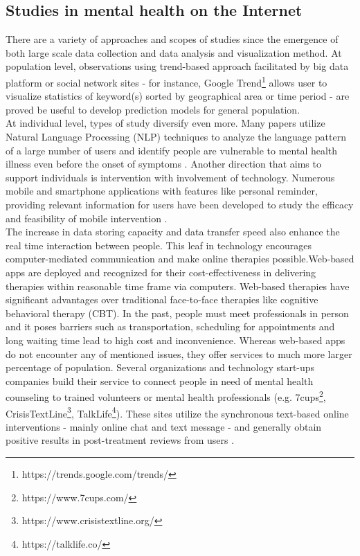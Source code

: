 \subsection*{Studies in mental health on the Internet}
There are a variety of approaches and scopes of studies since the emergence of both large scale data collection and data analysis and visualization method. At population level, observations using trend-based approach facilitated by big data platform or social network sites - for instance, Google Trend\footnote{https://trends.google.com/trends/ } allows user to visualize statistics of keyword(s) sorted by geographical area or time period - are proved be useful to develop prediction models for general population. \\
At individual level, types of study diversify even more. Many papers utilize Natural Language Processing (NLP) techniques to analyze the language pattern of a large number of users and identify people are vulnerable to mental health illness even before the onset of symptoms \cite{Almeida, DeChoudhury2013}. Another direction that aims to support individuals is intervention with involvement of technology. Numerous mobile and smartphone applications with features like personal reminder, providing relevant information for users have been developed to study the efficacy and feasibility of mobile intervention \cite{Rathbone2017}. \\
The increase in data storing capacity and data transfer speed also enhance the real time interaction between people. This leaf in technology encourages computer-mediated communication and make online therapies possible.Web-based apps are deployed and recognized for their cost-effectiveness in delivering therapies within reasonable time frame via computers. Web-based therapies have significant advantages over traditional face-to-face therapies like cognitive behavioral therapy (CBT). In the past, people must meet professionals in person and it poses barriers such as transportation, scheduling for appointments and long waiting time lead to high cost and inconvenience. Whereas web-based apps do not encounter any of mentioned issues, they offer services to much more larger percentage of population. Several organizations and technology start-ups companies build their service to connect people in need of mental health counseling to trained volunteers or mental health professionals (e.g. 7cups\footnote{https://www.7cups.com/}, CrisisTextLine\footnote{https://www.crisistextline.org/}, TalkLife\footnote{https://talklife.co/}). These sites utilize the synchronous text-based online interventions - mainly online chat and text message - and generally obtain positive results in post-treatment reviews from users \cite{Hoermann2017}.\\
